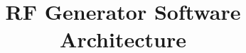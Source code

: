 \documentclass[10pt,a4paper]{article}
\title{RF Generator Software Architecture}
\begin{document}

	\begin{figure}
		\center
		
		\label{fig:hdmi_tx_ss_flow_chart}
	\end{figure}

	
	
%			
%
%		
%
%		
%	
%		
%	
%		
%		
%		
		
%		

	
%		
\end{document}
